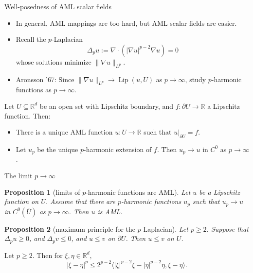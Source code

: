 \documentclass[10pt]{beamer}
\newcommand{\RR}{\mathbb{R}}
\DeclareMathOperator{\Lip}{Lip}
\newtheorem{proposition}{Proposition}
\begin{document}
\begin{frame}{Well-posedness of AML scalar fields}
\begin{itemize}
\item In general, AML mappings are too hard, but AML scalar fields are easier. \pause
\item Recall the $p$-Laplacian 
$$\Delta_p u := \nabla \cdot (|\nabla u|^{p - 2} \nabla u) = 0$$
whose solutions minimize $\|\nabla u\|_{L^p}$. \pause
\item Aronsson '67: Since $\|\nabla u\|_{L^p} \to \Lip(u, U)$ as $p \to \infty$, study $p$-harmonic functions as $p \to \infty$. \pause
\end{itemize}

\begin{theorem}
Let $U \subseteq \RR^d$ be an open set with Lipschitz boundary, and $f: \partial U \to \RR$ a Lipschitz function. Then: \pause
\begin{itemize}
\item There is a unique AML function $u: U \to \RR$ such that $u|_{\partial U} = f$. \pause
\item Let $u_p$ be the unique $p$-harmonic extension of $f$.
Then $u_p \to u$ in $C^0$ as $p \to \infty$.
\end{itemize}
\end{theorem}
\end{frame}

\begin{frame}{The limit $p \to \infty$}
\begin{proposition}[limits of $p$-harmonic functions are AML]
Let $u$ be a Lipschitz function on $U$.
Assume that there are $p$-harmonic functions $u_p$ such that $u_p \to u$ in $C^0(\overline U)$ as $p \to \infty$.
Then $u$ is AML. \pause
\end{proposition} 

\begin{proposition}[maximum principle for the $p$-Laplacian]
Let $p \geq 2$.
Suppose that $\Delta_p u \geq 0$, and $\Delta_p v \leq 0$, and $u \leq v$ on $\partial U$.
Then $u \leq v$ on $U$. \pause
\end{proposition}

\begin{lemma}
Let $p \geq 2$. Then for $\xi, \eta \in \RR^d$,
$$|\xi - \eta|^p \leq 2^{p - 2} \langle |\xi|^{p - 2} \xi - |\eta|^{p - 2} \eta, \xi - \eta\rangle.$$
\end{lemma}
    
\end{frame}
\end{document}
